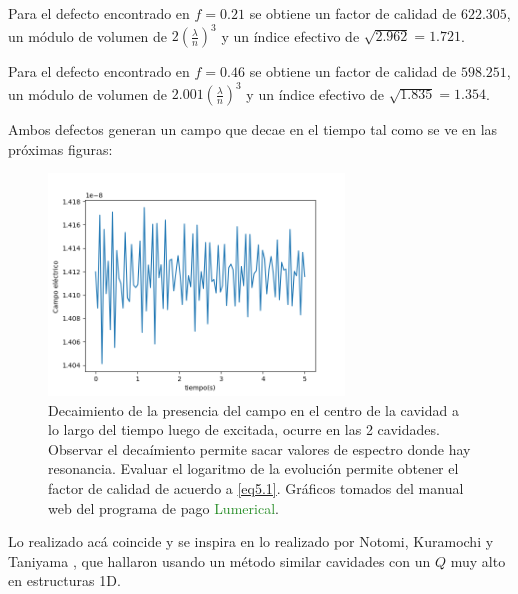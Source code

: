 \documentclass{book}
\begin{document}
Para el defecto encontrado en $f=0.21$ se obtiene un factor de calidad de $622.305$, un módulo de volumen de $2 (\frac{\lambda}{n})^3$ y un índice efectivo de $\sqrt{2.962}=1.721$. 

Para el defecto encontrado en $f=0.46$ se obtiene un factor de calidad de $598.251$, un módulo de volumen de $2.001 (\frac{\lambda}{n})^3$ y un índice efectivo de $\sqrt{1.835}=1.354$. 

Ambos defectos generan un campo que decae en el tiempo tal como se ve en las próximas figuras:

\begin{figure}[ht]
 \centering
    \includegraphics[width=0.7\textwidth]{field1.png}
 \caption{Decaimiento de la presencia del campo en el centro de la cavidad a lo largo del tiempo luego de excitada, ocurre en las 2 cavidades. Observar el decaímiento permite sacar valores de espectro donde hay resonancia. Evaluar el logaritmo de la evolución permite obtener el factor de calidad de acuerdo a \textcolor{blue}{\ref{eq5.1}}. Gráficos tomados del manual web del programa de pago \textcolor{ForestGreen}{Lumerical}.}
\end{figure}
 Lo realizado acá coincide y se inspira en lo realizado por Notomi, Kuramochi y Taniyama \textcolor{red}{\cite{Cavities}}, que hallaron usando un método similar cavidades con un $Q$ muy alto en estructuras 1D. 
\end{document}
